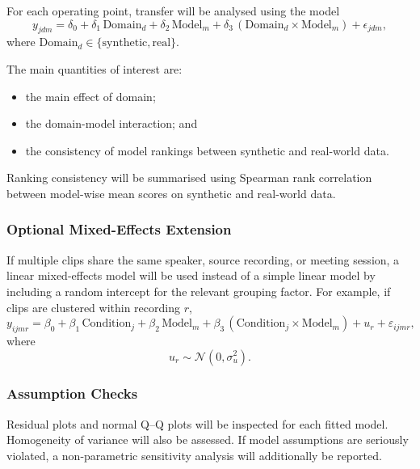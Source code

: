 For each operating point, transfer will be analysed using the model
\begin{equation}
    y_{jdm}
    =
    \delta_0
    +
    \delta_1 \,\mathrm{Domain}_d
    +
    \delta_2 \,\mathrm{Model}_m
    +
    \delta_3 \,(\mathrm{Domain}_d \times \mathrm{Model}_m)
    +
    \epsilon_{jdm},
\end{equation}
where \(\mathrm{Domain}_d \in \{\text{synthetic}, \text{real}\}\).

The main quantities of interest are:
\begin{itemize}
    \item the main effect of domain;
    \item the domain-model interaction; and
    \item the consistency of model rankings between synthetic and real-world data.
\end{itemize}

Ranking consistency will be summarised using Spearman rank correlation between model-wise mean scores on synthetic and real-world data.

\subsubsection{Optional Mixed-Effects Extension}

If multiple clips share the same speaker, source recording, or meeting session, a linear mixed-effects model will be used instead of a simple linear model by including a random intercept for the relevant grouping factor. For example, if clips are clustered within recording \(r\),
\begin{equation}
    y_{ijmr}
    =
    \beta_0
    +
    \beta_1 \,\mathrm{Condition}_j
    +
    \beta_2 \,\mathrm{Model}_m
    +
    \beta_3 \,(\mathrm{Condition}_j \times \mathrm{Model}_m)
    +
    u_r
    +
    \varepsilon_{ijmr},
\end{equation}
where
\begin{equation}
u_r \sim \mathcal{N}(0,\sigma_u^2).
\end{equation}

\subsubsection{Assumption Checks}

Residual plots and normal Q--Q plots will be inspected for each fitted model. Homogeneity of variance will also be assessed. If model assumptions are seriously violated, a non-parametric sensitivity analysis will additionally be reported.

